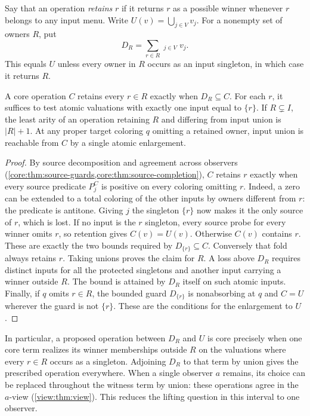 Say that an operation \emph{retains} $r$ if it returns $r$ as a
possible winner whenever $r$ belongs to any input menu. Write
$U(v)=\bigcup_{j\in V}v_j$. For a nonempty set of owners $R$, put
\[
 D_R=\sum_{r\in R}\mathop{\star_r}_{j\in V}v_j .
\]
This equals $U$ unless every owner in $R$ occurs as an input
singleton, in which case it returns $R$.

\begin{proposition}
\label{core:prop:retained-winner-folds}
A core operation $C$ retains every $r\in R$ exactly when $D_R\subseteq C$.
For each $r$, it suffices to test atomic valuations with exactly one
input equal to $\{r\}$. If $R\subsetneq I$, the least arity of an
operation retaining $R$ and differing from input union is $|R|+1$.
At any proper target coloring $q$ omitting a retained owner, input
union is reachable from $C$ by a single atomic enlargement.
\end{proposition}
\begin{proof}
By source decomposition and agreement across observers
(\cref{core:thm:source-guards,core:thm:source-completion}), $C$
retains $r$ exactly when every source predicate $P_j^C$ is positive
on every coloring omitting $r$. Indeed, a zero can be extended to
a total coloring of the other inputs by owners different from $r$:
the predicate is antitone. Giving $j$ the singleton $\{r\}$ now
makes it the only source of $r$, which is lost.
If no input is the $r$ singleton, every source probe for every winner
omits $r$, so retention gives $C(v)=U(v)$. Otherwise $C(v)$ contains
$r$. These are exactly the two bounds required by $D_{\{r\}}\subseteq C$.
Conversely that fold always retains $r$. Taking unions proves the
claim for $R$. A loss above $D_R$ requires distinct inputs for all
the protected singletons and another input carrying a winner outside
$R$. The bound is attained by $D_R$ itself on such atomic inputs.
Finally, if $q$ omits $r\in R$, the bounded guard $D_{\{r\}}$ is
nonabsorbing at $q$ and $C=U$ wherever the guard is not $\{r\}$.
These are the conditions for the enlargement to $U$.
\end{proof}

In particular, a proposed operation between $D_R$ and $U$ is core
precisely when one core term realizes
its winner memberships outside $R$ on the valuations where every
$r\in R$ occurs as a singleton. Adjoining $D_R$ to that term by
union gives the prescribed operation everywhere. When a single
observer $a$ remains, its choice can be replaced throughout the
witness term by union: these operations agree in the $a$-view
(\cref{view:thm:view}). This reduces the lifting question in this
interval to one observer.

